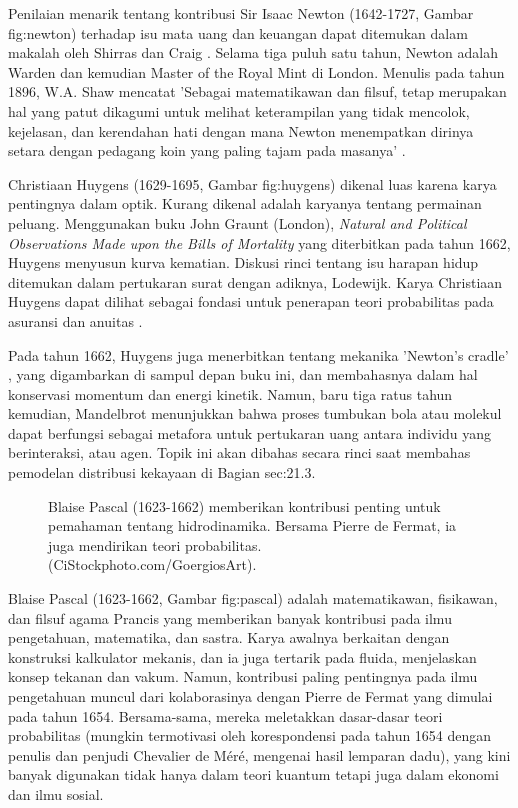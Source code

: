 \documentclass[a4paper,12pt]{book}
\begin{document}
Penilaian menarik tentang kontribusi Sir Isaac Newton (1642-1727, Gambar  {fig:newton}) terhadap isu mata uang dan keuangan dapat ditemukan dalam makalah oleh Shirras dan Craig \cite{shirras1945}. Selama tiga puluh satu tahun, Newton adalah Warden dan kemudian Master of the Royal Mint di London. Menulis pada tahun 1896, W.A. Shaw mencatat 'Sebagai matematikawan dan filsuf, tetap merupakan hal yang patut dikagumi untuk melihat keterampilan yang tidak mencolok, kejelasan, dan kerendahan hati dengan mana Newton menempatkan dirinya setara dengan pedagang koin yang paling tajam pada masanya' \cite{shaw1896}.


Christiaan Huygens (1629-1695, Gambar  {fig:huygens}) dikenal luas karena karya pentingnya dalam optik. Kurang dikenal adalah karyanya tentang permainan peluang. Menggunakan buku John Graunt (London), \textit{Natural and Political Observations Made upon the Bills of Mortality} yang diterbitkan pada tahun 1662, Huygens menyusun kurva kematian. Diskusi rinci tentang isu harapan hidup ditemukan dalam pertukaran surat dengan adiknya, Lodewijk. Karya Christiaan Huygens dapat dilihat sebagai fondasi untuk penerapan teori probabilitas pada asuransi dan anuitas \cite{dahlke1989}.

Pada tahun 1662, Huygens juga menerbitkan tentang mekanika 'Newton's cradle' \cite{hutzler2004}, yang digambarkan di sampul depan buku ini, dan membahasnya dalam hal konservasi momentum dan energi kinetik. Namun, baru tiga ratus tahun kemudian, Mandelbrot menunjukkan bahwa proses tumbukan bola atau molekul dapat berfungsi sebagai metafora untuk pertukaran uang antara individu yang berinteraksi, atau agen. Topik ini akan dibahas secara rinci saat membahas pemodelan distribusi kekayaan di Bagian  {sec:21.3}.

\begin{figure}[h]
\centering
\caption{Blaise Pascal (1623-1662) memberikan kontribusi penting untuk pemahaman tentang hidrodinamika. Bersama Pierre de Fermat, ia juga mendirikan teori probabilitas. (CiStockphoto.com/GoergiosArt).}
\label{fig:pascal}
\end{figure}

Blaise Pascal (1623-1662, Gambar  {fig:pascal}) adalah matematikawan, fisikawan, dan filsuf agama Prancis yang memberikan banyak kontribusi pada ilmu pengetahuan, matematika, dan sastra. Karya awalnya berkaitan dengan konstruksi kalkulator mekanis, dan ia juga tertarik pada fluida, menjelaskan konsep tekanan dan vakum. Namun, kontribusi paling pentingnya pada ilmu pengetahuan muncul dari kolaborasinya dengan Pierre de Fermat yang dimulai pada tahun 1654. Bersama-sama, mereka meletakkan dasar-dasar teori probabilitas (mungkin termotivasi oleh korespondensi pada tahun 1654 dengan penulis dan penjudi Chevalier de Méré, mengenai hasil lemparan dadu), yang kini banyak digunakan tidak hanya dalam teori kuantum tetapi juga dalam ekonomi dan ilmu sosial.
\end{document}
